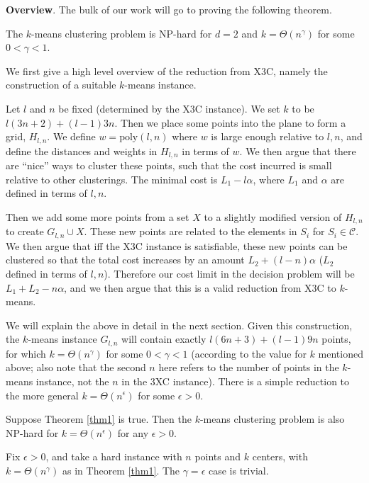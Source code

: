 \textbf{Overview}. The bulk of our work will go to proving the following theorem.

\begin{theorem}\label{thm1}
The $k$-means clustering problem is NP-hard for $d=2$ and $k=\Theta(n^\gamma)$ for some $0<\gamma<1$.
\end{theorem}

We first give a high level overview of the reduction from X3C, namely the construction of a suitable $k$-means instance.

Let $l$ and $n$ be fixed (determined by the X3C instance). We set $k$ to be $l(3n+2)+(l-1)3n$. Then we place some points into the plane to form a grid, $H_{l,n}$. We define $w =\text{poly}(l, n)$ where $w$ is large enough relative to $l,n$, and define the distances and weights in $H_{l,n}$ in terms of $w$. We then argue that there are ``nice'' ways to cluster these points, such that the cost incurred is small relative to other clusterings. The minimal cost is $L_1-l\alpha$, where $L_1$ and $\alpha$ are defined in terms of $l,n$.

Then we add some more points from a set $X$ to a slightly modified version of $H_{l,n}$ to create $G_{l,n}\cup X$. These new points are related to the elements in $S_i$ for $S_i\in\mathcal{C}$. We then argue that iff the X3C instance is satisfiable, these new points can be clustered so that the total cost increases by an amount $L_2+(l-n)\alpha$ ($L_2$ defined in terms of $l,n$). Therefore our cost limit in the decision problem will be $L_1+L_2-n\alpha$, and we then argue that this is a valid reduction from X3C to $k$-means.

We will explain the above in detail in the next section. Given this construction, the $k$-means instance $G_{l,n}$ will contain exactly $l(6n+3)+(l-1)9n$ points, for which $k=\Theta(n^\gamma)$ for some $0<\gamma<1$ (according to the value for $k$ mentioned above; also note that the second $n$ here refers to the number of points in the $k$-means instance, not the $n$ in the 3XC instance). There is a simple reduction to the more general $k=\Theta(n^\epsilon)$ for some $\epsilon>0$.

\begin{theorem}
    Suppose Theorem \ref{thm1} is true. Then the $k$-means clustering problem is also NP-hard for $k=\Theta(n^\epsilon)$ for any $\epsilon>0$.
\end{theorem}

Fix $\epsilon>0$, and take a hard instance with $n$ points and $k$ centers, with $k=\Theta(n^\gamma)$ as in Theorem \ref{thm1}. The $\gamma=\epsilon$ case is trivial.

